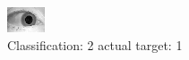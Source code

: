 \begin{figure}[h!]
\begin{center}
\includegraphics[width=0.60\columnwidth]{figures/ID1468_class_2_target_1.png}
\end{center}
\caption{ Classification: 2 actual target: 1}
\label{fig:ID1468_class_2_target_1}
\end{figure}
